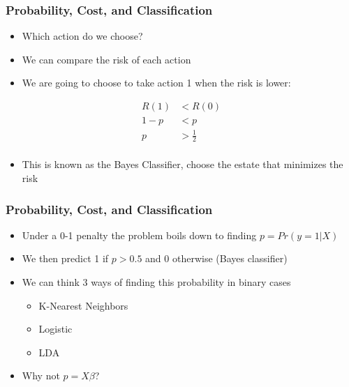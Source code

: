 \documentclass[
  shownotes,
  xcolor={svgnames},
  hyperref={colorlinks,citecolor=DarkBlue,linkcolor=DarkRed,urlcolor=DarkBlue}
  , aspectratio=169]{beamer}
\begin{document}
\begin{frame}[fragile]
\frametitle{Probability, Cost, and Classification}

\begin{itemize}
  \item Which action do we choose?
 \bigskip
 \pause
  \item We can compare the risk of each action
  \medskip
  \item We are going to choose to take action 1 when the risk is lower:
\end{itemize}

\begin{align}
R(1) &< R(0) \\ \nonumber
1-p &< p \\ \nonumber
p &> \frac{1}{2} \\ \nonumber
\end{align}

\begin{itemize}
  \item This is known as the Bayes Classifier, choose the estate that minimizes the risk
\end{itemize}

\end{frame}
\begin{frame}[fragile]
\frametitle{Probability, Cost, and Classification}

\begin{itemize}
  \item Under a 0-1 penalty the problem boils down to finding $p=Pr(y=1|X)$
  \medskip
  \item We then predict 1 if $p>0.5$ and 0 otherwise (Bayes classifier)
  \medskip
  \item We can think 3 ways of finding this probability in binary cases
  \begin{itemize}
    \item K-Nearest Neighbors
    \item Logistic
    \item LDA
  \end{itemize}
\medskip
  \item Why not $p=X\beta$?
\end{itemize}


\end{frame}
\end{document}
